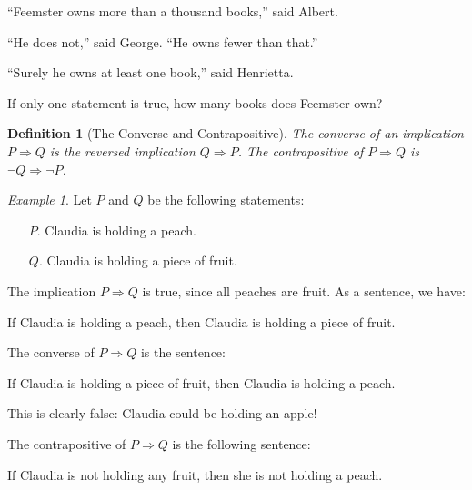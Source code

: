 \documentclass[11pt]{exam}
\newtheorem{definition}[thm]{Definition}
\theoremstyle{remark}
\newtheorem{example}[thm]{Example}
\numberwithin{equation}{section}
\begin{document}
\begin{questions}
\newpage

\question ``Feemster owns more than a thousand books,'' said Albert. 

``He does not,'' said George. ``He owns fewer than that.'' 

``Surely he owns at least one book,'' said Henrietta. 

If only one statement is true, how many books does Feemster own? 

\newpage

\begin{definition}[The Converse and Contrapositive]
    The converse of an implication $P \Longrightarrow Q$ is the reversed implication $Q \Longrightarrow P$.
The contrapositive of $P \Longrightarrow Q$ is $\lnot Q \Longrightarrow \lnot P$.

\end{definition}

\vspace{1in}


\begin{example}
Let $P$ and $Q$ be the following statements:
\begin{itemize}
    \item[$P.$] Claudia is holding a peach.
    \item[$Q.$] Claudia is holding a piece of fruit.
\end{itemize}

The implication $P \Longrightarrow Q$ is true, since all peaches are fruit. As a sentence, we have: 

\begin{displayquote}
If Claudia is holding a peach, then Claudia is holding a piece of fruit.
\end{displayquote}

\medskip

The converse of $P \Longrightarrow Q$ is the sentence:

\begin{displayquote}
If Claudia is holding a piece of fruit, then Claudia is holding a peach.
\end{displayquote}

This is clearly false: Claudia could be holding an apple!

\bigskip

The contrapositive of $P \Longrightarrow Q$ is the following sentence:

\begin{displayquote}
If Claudia is not holding any fruit, then she is not holding a peach.
\end{displayquote}


\end{example}
\end{questions}
\end{document}
